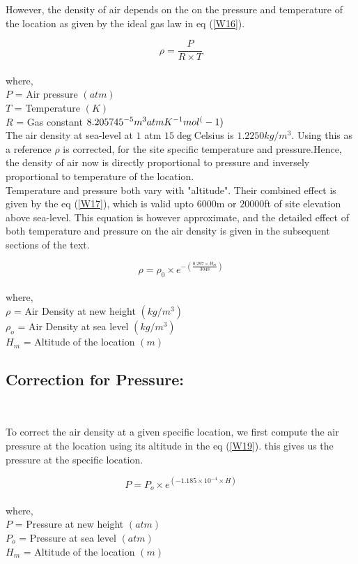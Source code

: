 However, the density of air depends on the on the pressure and temperature of the location as given by the ideal gas law in eq (\ref{W16}).

\begin{equation}
\label{W16}
\rho = \frac{P}{R \times T}
\end{equation}\\
where,\\
$ P $ = Air pressure $ (atm) $\\
$ T $ = Temperature $ (K) $\\
$ R $ = Gas constant $ 8.205745 \time 10^{-5} m^{3} atm K^{-1} mol^(-1) $\\

The air density at sea-level at $1$ atm  $15 \deg$Celsius is $1.2250 kg/m^3$. Using this as a reference $\rho$ is corrected, for the site specific temperature and pressure.Hence, the density of air now is directly proportional to pressure and inversely proportional to temperature of the location.\\

Temperature and pressure both vary with "altitude". Their combined effect is given by the eq (\ref{W17}), which is valid upto $6000$m or $20000$ft of site elevation above sea-level. This equation is however approximate, and the detailed effect of both temperature and pressure on the air density is given in the subsequent sections of the text.

\begin{equation}
\label{W17}
\rho = \rho_0 \times e^{-{\left(\frac{0.297\times H_m}{3048}\right)}}
\end{equation}\\
where,\\
$ \rho $ = Air Density at new height $(kg/m^3)$ \\ 
$ \rho_{o} $ = Air Density at sea level $(kg/m^3)$ \\
$ H_{m} $ = Altitude of the location $(m)$\\


\subsection{Correction for Pressure:}
\
\
\
\

To correct the air density at a given specific location, we first compute the air pressure at the location using its altitude in the eq (\ref{W19}). this gives us the pressure at the specific location.

\begin{equation}
\label{W19}
P = P_{o} \times e^{(-1.185 \times 10^{-4} \times H)}
\end{equation}\\
where,\\
$ P $ = Pressure at new height $(atm)$ \\ 
$ P_{o} $ = Pressure at sea level $(atm)$ \\
$ H_{m} $ = Altitude of the location $(m)$\\


